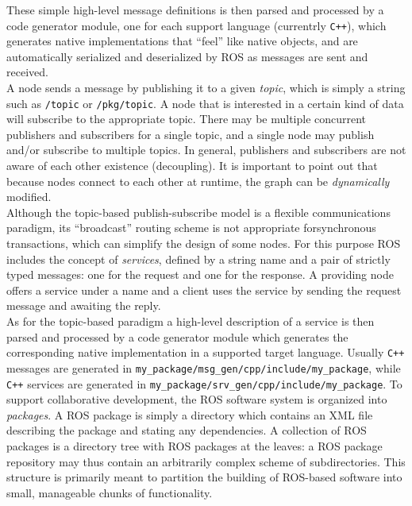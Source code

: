 These simple high-level message definitions is then parsed and processed by a code 
generator module, one for each support language (currentrly \texttt{C++}), which generates 
native implementations that “feel” like native objects, and are automatically 
serialized and deserialized by ROS as messages are sent and received.
\\
A node sends a message by publishing it to a given \textit{topic}, which is simply
a string such as \texttt{/topic} or \texttt{/pkg/topic}. A node that is interested
in a certain kind of data will subscribe to the appropriate topic. There may be multiple
concurrent publishers and subscribers for a single topic, and a single node
may publish and/or subscribe to multiple topics. In general, publishers and
subscribers are not aware of each other existence (decoupling). 
It is important to point out that because nodes connect to each other at runtime,
the graph can be \textit{dynamically} modified.
\\
Although the topic-based publish-subscribe model is a flexible communications
paradigm, its “broadcast” routing scheme is not appropriate forsynchronous transactions,
which can simplify the design of some nodes.
For this purpose ROS includes the concept of \textit{services}, defined by a string name
and a pair of strictly typed messages: one for the request and one for the
response. A providing node offers a service under a name and a client uses
the service by sending the request message and awaiting the reply.
\\
As for the topic-based paradigm a high-level description of a service is then
parsed and processed by a code generator module which generates the corresponding
native implementation in a supported target language.
Usually \texttt{C++} messages are generated in \texttt{my\_package/msg\_gen/cpp/include/my\_package},
while \texttt{C++} services are generated in \texttt{my\_package/srv\_gen/cpp/include/my\_package}.
To support collaborative development, the ROS software system is organized into \textit{packages}.
A ROS package is simply a directory which contains an XML file describing the package
and stating any dependencies. A collection of ROS packages is a directory tree with ROS
packages at the leaves: a ROS package repository may thus contain an arbitrarily complex
scheme of subdirectories. This structure is primarily meant to partition the building of 
ROS-based software into small, manageable chunks of functionality.
